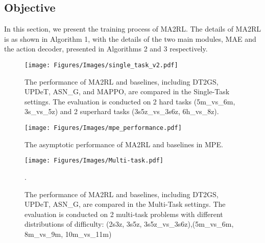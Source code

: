\subsection{Objective}
In this section, we present the training process of  MA2RL. The details of MA2RL is as shown in Algorithm 1, with the details of the two main modules, MAE and the action decoder, presented in Algorithms 2 and 3 respectively.

\begin{figure*}[ht]
    \centering
    \texttt{[image: Figures/Images/single\_task\_v2.pdf]}
    \caption{The performance of MA2RL and baselines, including DT2GS, UPDeT, ASN\_G, and MAPPO, are compared in the Single-Task settings. The evaluation is conducted on 2 hard tasks (5m\_vs\_6m, 3s\_vs\_5z) and 2 superhard tasks (3s5z\_vs\_3s6z, 6h\_vs\_8z).}
\label{fig:single_task}
\end{figure*}
\begin{figure}[h]
    \centering
    \texttt{[image: Figures/Images/mpe\_performance.pdf]}
    \caption{The asymptotic performance of MA2RL and baselines in MPE.}
\label{fig:asymptotic_mpe}
\end{figure}
\begin{figure*}[ht]
    \centering
    \texttt{[image: Figures/Images/Multi-task.pdf]}
    \caption{The performance of MA2RL and baselines, including DT2GS, UPDeT, ASN\_G, are compared in the Multi-Task settings. The evaluation is conducted on 2 multi-task problems with different distributions of difficulty: (2s3z, 3s5z, 3s5z\_vs\_3s6z),(5m\_vs\_6m, 8m\_vs\_9m, 10m\_vs\_11m) }.
\label{fig:multi_task}
\end{figure*}
